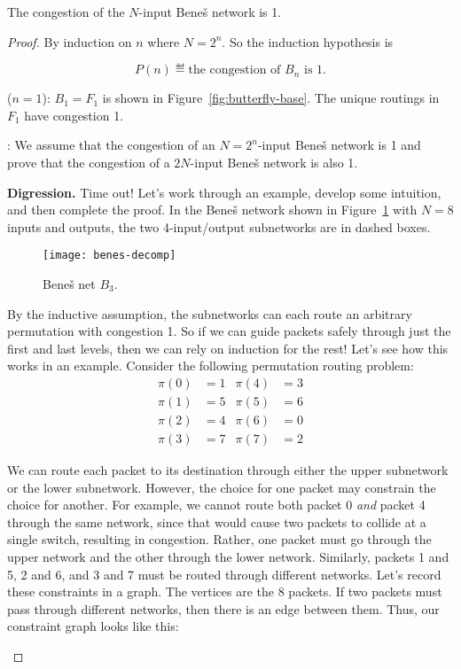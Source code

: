 \begin{theorem}
The congestion of the $N$-input Bene\v{s} network is 1.

\iffalse , where $N = 2^a$ for some $a \geq 1$\fi

\end{theorem}

\begin{proof}
By induction on $n$ where $N=2^n$.  So the induction hypothesis is

\[
P(n) \eqdef  \text{the congestion of $B_n$ is 1}.
\]

 ($n=1$): $B_1 =F_1$ is shown in
Figure~\ref{fig:butterfly-base}.  The unique routings in $F_1$ have
congestion 1.

: We assume that the congestion of an
$N=2^n$-input Bene\v{s} network is 1 and prove that the congestion of
a $2N$-input Bene\v{s} network is also 1.

\textbf{Digression.}  Time out!  Let's work through an example,
develop some intuition, and then complete the proof.  In the Bene\v{s}
network shown in Figure~\ref{fig:B_3} with $N=8$ inputs and outputs,
the two 4-input/output subnetworks are in dashed boxes.

\begin{figure}[h]
\texttt{[image: benes-decomp]}
\caption{Bene\v{s} net $B_3$.}
\label{fig:B_3}
\end{figure}

By the inductive assumption, the subnetworks can each route an
arbitrary permutation with congestion 1.  So if we can guide packets
safely through just the first and last levels, then we can rely on
induction for the rest!  Let's see how this works in an example.
Consider the following permutation routing problem:
%
\begin{align*}
\pi(0) & = 1 & \pi(4) & = 3 \\
\pi(1) & = 5 & \pi(5) & = 6 \\
\pi(2) & = 4 & \pi(6) & = 0 \\
\pi(3) & = 7 & \pi(7) & = 2
\end{align*}

We can route each packet to its destination through either the upper
subnetwork or the lower subnetwork.  However, the choice for one
packet may constrain the choice for another.  For example, we cannot
route both packet 0 \textit{and} packet 4 through the same network,
since that would cause two packets to collide at a single switch,
resulting in congestion.  Rather, one packet must go through the upper
network and the other through the lower network.  Similarly, packets 1
and 5, 2 and 6, and 3 and 7 must be routed through different networks.
Let's record these constraints in a graph.  The vertices are the 8
packets.  If two packets must pass through different networks, then
there is an edge between them.  Thus, our constraint graph looks like
this:
\begin{center}
\end{center}


\end{proof}
